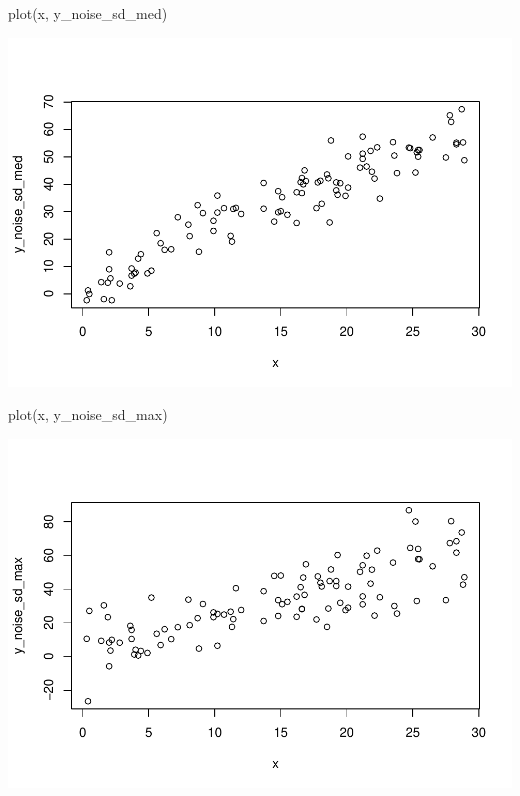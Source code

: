 \documentclass[
]{book}
\newenvironment{Shaded}{\begin{snugshade}}{\end{snugshade}}
\newcommand{\FunctionTok}[1]{\textcolor[rgb]{0.00,0.00,0.00}{#1}}
\newcommand{\NormalTok}[1]{#1}
\begin{document}
\begin{Shaded}
\begin{Highlighting}[]
\FunctionTok{plot}\NormalTok{(x, y\_noise\_sd\_med)}
\end{Highlighting}
\end{Shaded}

\includegraphics{test_course_notes_files/figure-latex/remedy006-3.pdf}

\begin{Shaded}
\begin{Highlighting}[]
\FunctionTok{plot}\NormalTok{(x, y\_noise\_sd\_max)}
\end{Highlighting}
\end{Shaded}

\includegraphics{test_course_notes_files/figure-latex/remedy006-4.pdf}
\end{document}
